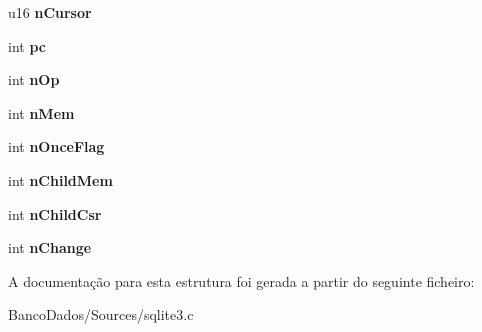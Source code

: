 \begin{DoxyCompactItemize}
\item 
\hypertarget{struct_vdbe_frame_af6d743df3f86ff683959562c1b615655}{u16 {\bfseries n\-Cursor}}\label{struct_vdbe_frame_af6d743df3f86ff683959562c1b615655}

\item 
\hypertarget{struct_vdbe_frame_aed0e6d8cb1908580a3c2aca04516b46c}{int {\bfseries pc}}\label{struct_vdbe_frame_aed0e6d8cb1908580a3c2aca04516b46c}

\item 
\hypertarget{struct_vdbe_frame_acffd5d53fbb5cb55e257c34a547c1762}{int {\bfseries n\-Op}}\label{struct_vdbe_frame_acffd5d53fbb5cb55e257c34a547c1762}

\item 
\hypertarget{struct_vdbe_frame_ab340f2b5f6d6e09a872f5f8a64fec245}{int {\bfseries n\-Mem}}\label{struct_vdbe_frame_ab340f2b5f6d6e09a872f5f8a64fec245}

\item 
\hypertarget{struct_vdbe_frame_a04707991a2907a48a1c3b76f3da4d26b}{int {\bfseries n\-Once\-Flag}}\label{struct_vdbe_frame_a04707991a2907a48a1c3b76f3da4d26b}

\item 
\hypertarget{struct_vdbe_frame_a833bdf519676567bc3a700cdedc6562d}{int {\bfseries n\-Child\-Mem}}\label{struct_vdbe_frame_a833bdf519676567bc3a700cdedc6562d}

\item 
\hypertarget{struct_vdbe_frame_a2d2900348092258d12eb71057812429a}{int {\bfseries n\-Child\-Csr}}\label{struct_vdbe_frame_a2d2900348092258d12eb71057812429a}

\item 
\hypertarget{struct_vdbe_frame_a77aacb67d627f4446dd50a795b5a2f0f}{int {\bfseries n\-Change}}\label{struct_vdbe_frame_a77aacb67d627f4446dd50a795b5a2f0f}

\end{DoxyCompactItemize}


A documentação para esta estrutura foi gerada a partir do seguinte ficheiro\-:\begin{DoxyCompactItemize}
\item 
Banco\-Dados/\-Sources/sqlite3.\-c\end{DoxyCompactItemize}
